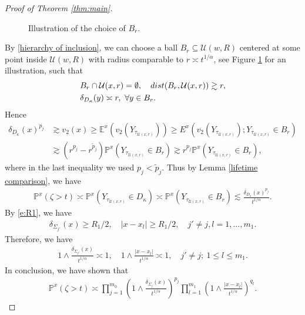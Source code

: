 \documentclass[12pt,a4paper]{amsart}
\numberwithin{equation}{section}
\theoremstyle{plain}
\newcommand{\Si}{\Sigma}
\newcommand{\mc}{\mathcal}
\newcommand{\mb}{\mathbb}
\newcommand{\wt}{\widetilde}
\newcommand{\1}{\mathbbm{1}}
\newcommand{\dist}{{\rm dist}}
\begin{document}
\begin{proof}[Proof of Theorem \ref{thm:main}]
\begin{center}
\begin{figure}[H]
\caption{Illustration of the choice of $B_r$.}
\label{figure:ball}
\end{figure}
\end{center}
By  \eqref{hierarchy of inclusion}, 
we can choose a ball $B_r\subseteq \mc U(w,R)$ centered at some point inside $\mc U(w,R)$ with radius comparable to $r \asymp t^{1/\alpha}$, see Figure \ref{figure:ball} for an illustration, such that 
\begin{align*}
& B_r \cap \mc U(x,r) = \emptyset,  \quad \dist(B_r, \mc U(x,r)) \gtrsim r, \\
& \delta_{D_{\kappa}}(y) \asymp r,\ \forall y \in B_r.
\end{align*} 
Hence
\begin{align*}
\delta_{D_{\kappa}}(x)^{p_j} & \gtrsim v_2(x) \ge \mb E^x(v_2(Y_{\tau_{\mc U(x,r)}})) \ge E^x(v_2(Y_{\tau_{\mc U(x,r)}}); Y_{\tau_{\mc U(x,r)}} \in B_r) \\
& \gtrsim (r^{p_j} - r^{\wt p_j}) \mb P^{x}(Y_{\tau_{\mc U(x,r)}} \in B_r) \gtrsim r^{p_j}\mb P^{x}(Y_{\tau_{\mc U(x,r)}} \in B_r), 
\end{align*}
where in the last inequality we used $p_j<\wt p_j$. Thus
by Lemma \ref{lifetime comparison}, we have 
\begin{align*}
\mb P^x(\zeta > t) \asymp \mb P^x(Y_{\tau_{\mc U(x,r)}} \in D_\kappa)
\asymp \mb P^{x}(Y_{\tau_{\mc U(x,r)}} \in B_r) \lesssim \frac{\delta_{D_{\kappa}}(x)^{p_j}}{t^{1/\alpha}}.
\end{align*}
By \eqref{e:R1}, we have 
\begin{align*}
\delta_{\Si_{j'}}(x) \ge R_1/2, \quad |x-x_l|\ge R_1/2, \quad j' \neq j, l=1, \dots, m_1.
\end{align*}
Therefore, we have 
\begin{align*}
1 \wedge \frac{\delta_{\Si_{j'}}(x)}{t^{1/\alpha}} \asymp 1, \quad 1 \wedge \frac{|x-x_l|}{t^{1/\alpha}} \asymp 1,
\quad j'\neq j; \ 1\le l\le m_1.
\end{align*}
In conclusion, we have shown that 
\begin{align*}
\mb P^x(\zeta >t) 
\asymp \prod_{j=1}^{m_0} (1\wedge \frac{\delta_{\Si_j}(x)}{t^{1/\alpha}})^{p_j} \prod_{l=1}^{m_1} (1\wedge \frac{|x-x_l|}{t^{1/\alpha}})^{q_l}.
\end{align*}


\end{proof}
\end{document}
